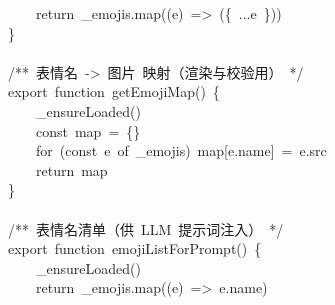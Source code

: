 \documentclass[a4paper,10pt]{article}
\begin{document}
{~~~~return~\_emojis.map((e)~=>~(\{~...e~\}))\\
\}\\
\mbox{}\\
/**~表情名~->~图片~映射（渲染与校验用）~*/\\
export~function~getEmojiMap()~\{\\
~~~~\_ensureLoaded()\\
~~~~const~map~=~\{\}\\
~~~~for~(const~e~of~\_emojis)~map[e.name]~=~e.src\\
~~~~return~map\\
\}\\
\mbox{}\\
/**~表情名清单（供~LLM~提示词注入）~*/\\
export~function~emojiListForPrompt()~\{\\
~~~~\_ensureLoaded()\\
~~~~return~\_emojis.map((e)~=>~e.name)
}

\newpage
\end{document}
